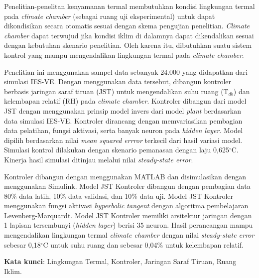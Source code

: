 Penelitian-penelitan kenyamanan termal membutuhkan kondisi lingkungan termal pada \textit{climate chamber} (sebagai ruang uji eksperimental) untuk dapat dikondisikan secara otomatis sesuai dengan skema pengujian penelitian. \textit{Climate chamber} dapat terwujud jika kondisi iklim di dalamnya dapat dikendalikan sesuai dengan kebutuhan skenario penelitian. Oleh karena itu, dibutuhkan suatu sistem kontrol yang mampu mengendalikan lingkungan termal pada \textit{climate chamber}.

Penelitian ini menggunakan sampel data sebanyak 24.000 yang didapatkan dari simulasi IES-VE. Dengan menggunakan data tersebut, dibangun kontroler berbasis jaringan saraf tiruan (JST) untuk mengendalikan suhu ruang (T$_{db}$) dan kelembapan relatif (RH) pada \textit{climate chamber}. Kontroler dibangun dari model JST dengan menggunakan prinsip model invers dari model \textit{plant} berdasarkan data simulasi IES-VE. Kontroler dirancang dengan memvariasikan pembagian data pelatihan, fungsi aktivasi, serta banyak neuron pada \textit{hidden layer}. Model dipilih berdasarkan nilai \textit{mean squared errror} terkecil dari hasil variasi model. Simulasi kontrol dilakukan dengan skenario pemanasan dengan laju 0,625$^\circ$C. Kinerja hasil simulasi ditinjau melalui nilai \textit{steady-state error}.

Kontroler dibangun dengan menggunakan MATLAB dan disimulasikan dengan menggunakan Simulink. Model JST Kontroler dibangun dengan pembagian data 80\% data latih, 10\% data validasi, dan 10\% data uji. Model JST Kontroler menggunakan fungsi aktivasi \textit{hyperbolic tangent} dengan algoritma pembelajaran Levenberg-Marquardt. Model JST Kontroler memiliki arsitektur jaringan dengan 1 lapisan tersembunyi (\textit{hidden layer}) berisi 35 neuron. Hasil perancangan mampu mengendalikan lingkungan termal \textit{climate chamber} dengan nilai \textit{steady-state error} sebesar 0,18$^\circ$C untuk suhu ruang dan sebesar 0,04\% untuk kelembapan relatif.

\vspace{0.5cm}
\hspace{-1.2cm}
\textbf{Kata kunci}: Lingkungan Termal, Kontroler, Jaringan Saraf Tiruan, Ruang Iklim.


